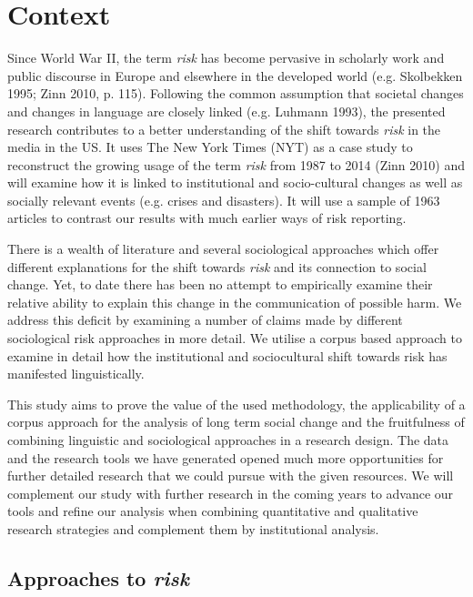 
\chapter{Context} %

Since World War II, the term \emph{risk} has become pervasive in scholarly work and public discourse in Europe and elsewhere in the developed world (e.g. Skolbekken 1995; Zinn 2010, p. 115). Following the common assumption that societal changes and changes in language are closely linked (e.g. Luhmann 1993), the presented research contributes to a better understanding of the shift towards \emph{risk} in the media in the US. It uses The New York Times (NYT) as a case study to reconstruct the growing usage of the term \emph{risk} from 1987 to 2014 (Zinn 2010) and will examine how it is linked to institutional and socio-cultural changes as well as socially relevant events (e.g. crises and disasters). It will use a sample of 1963 articles to contrast our results with much earlier ways of risk reporting. 

There is a wealth of literature and several sociological approaches which offer different explanations for the shift towards \emph{risk} and its connection to social change. Yet, to date there has been no attempt to empirically examine their relative ability to explain this change in the communication of possible harm. We address this deficit by examining a number of claims made by different sociological risk approaches in more detail. We utilise a corpus based approach to examine in detail how the institutional and sociocultural shift towards risk has manifested linguistically.

This study aims to prove the value of the used methodology, the applicability of a corpus approach for the analysis of long term social change and the fruitfulness of combining linguistic and sociological approaches in a research design. The data and the research tools we have generated opened much more opportunities for further detailed research that we could pursue with the given resources. We will complement our study with further research in the coming years to advance our tools and refine our analysis when combining quantitative and qualitative research strategies and complement them by institutional analysis.

\section{Approaches to \emph{risk}}

